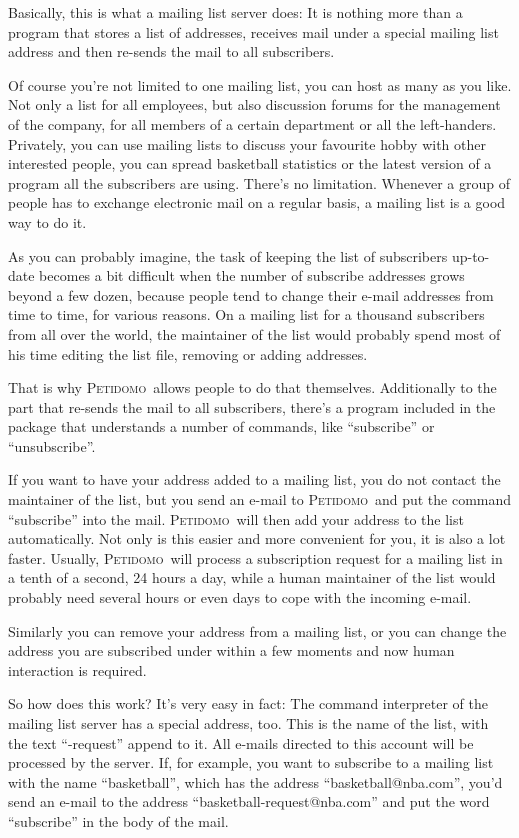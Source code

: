 \documentclass[a4paper]{report}
\newcommand{\Petidomo}{{\scshape Peti\-domo}}
\begin{document}
Basically, this is what a mailing list server does: It is nothing more
than a program that stores a list of addresses, receives mail under a
special mailing list address and then re-sends the mail to all
subscribers.

Of course you're not limited to one mailing list, you can host as many
as you like. Not only a list for all employees, but also discussion
forums for the management of the company, for all members of a certain
department or all the left-handers. Privately, you can use mailing
lists to discuss your favourite hobby with other interested people,
you can spread basketball statistics or the latest version of a
program all the subscribers are using. There's no limitation. Whenever
a group of people has to exchange electronic mail on a regular basis,
a mailing list is a good way to do it.

\bigskip

As you can probably imagine, the task of keeping the list of
subscribers up-to-date becomes a bit difficult when the number of
subscribe addresses grows beyond a few dozen, because people tend to
change their e-mail addresses from time to time, for various reasons.
On a mailing list for a thousand subscribers from all over the world,
the maintainer of the list would probably spend most of his time
editing the list file, removing or adding addresses.

That is why \Petidomo\ allows people to do that themselves.
Additionally to the part that re-sends the mail to all subscribers,
there's a program included in the package that understands a number of
commands, like ``subscribe'' or ``unsubscribe''.

If you want to have your address added to a mailing list, you do not
contact the maintainer of the list, but you send an e-mail to
\Petidomo\ and put the command ``subscribe'' into the mail. \Petidomo\
will then add your address to the list automatically. Not only is this
easier and more convenient for you, it is also a lot faster. Usually,
\Petidomo\ will process a subscription request for a mailing list in a
tenth of a second, 24 hours a day, while a human maintainer of the
list would probably need several hours or even days to cope with the
incoming e-mail.

Similarly you can remove your address from a mailing list, or you can
change the address you are subscribed under within a few moments and
now human interaction is required.

So how does this work? It's very easy in fact: The command interpreter
of the mailing list server has a special address, too. This is the
name of the list, with the text ``-request'' append to it. All e-mails
directed to this account will be processed by the server. If, for
example, you want to subscribe to a mailing list with the name
``basketball'', which has the address ``basketball@nba.com'', you'd
send an e-mail to the address ``basketball-request@nba.com'' and put
the word ``subscribe'' in the body of the mail.
\end{document}
